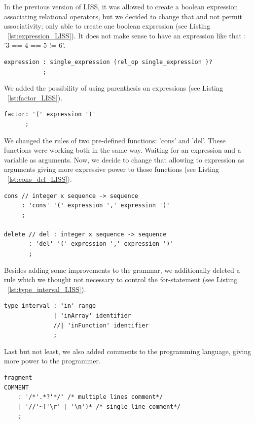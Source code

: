 \documentclass[
  oneside,
  11pt, a4paper,
  footinclude=true,
  headinclude=true,
  cleardoublepage=empty
]{scrbook}
\begin{document}
In the previous version of LISS, it was allowed to create a boolean expression associating relational operators, but we decided to change that and not permit associativity; only able to create one boolean expression (see Listing ~\ref{lst:expression_LISS}).
It does not make sense to have an expression like that : '3 == 4 == 5 != 6'.
\begin{lstlisting}[caption={Rule for Boolean expression},label={lst:expression_LISS}]
expression : single_expression (rel_op single_expression )?
           ;
\end{lstlisting}

We added the possibility of using parenthesis on expressions (see Listing ~\ref{lst:factor_LISS}).

\begin{lstlisting}[caption={Rule factor},label={lst:factor_LISS}]
factor: '(' expression ')'
      ;
\end{lstlisting}

We changed the rules of two pre-defined functions: 'cons' and 'del'. These functions were working both in the same way. Waiting for an expression and a variable as arguments. Now, we decide to change that allowing to expression as arguments giving more expressive power to those functions (see Listing ~\ref{lst:cons_del_LISS}).

\begin{lstlisting}[caption={Rule cons and delete},label={lst:cons_del_LISS}]
cons // integer x sequence -> sequence
     : 'cons' '(' expression ',' expression ')'
     ;

delete // del : integer x sequence -> sequence
       : 'del' '(' expression ',' expression ')'
       ;
\end{lstlisting}

Besides adding some improvements to the grammar, we additionally deleted a rule which we thought not necessary to control the for-statement (see Listing ~\ref{lst:type_interval_LISS}).
\begin{lstlisting}[caption={Rule type interval},label={lst:type_interval_LISS}]
type_interval : 'in' range
              | 'inArray' identifier
              //| 'inFunction' identifier
              ;
\end{lstlisting}

Last but not least, we also added comments to the programming language, giving more power to the programmer.

\begin{lstlisting}[caption={Lexical rule for Comment},label={lst:comments_LISS}]
fragment
COMMENT
    : '/*'.*?'*/' /* multiple lines comment*/
    | '//'~('\r' | '\n')* /* single line comment*/
    ;
\end{lstlisting}
\end{document}
